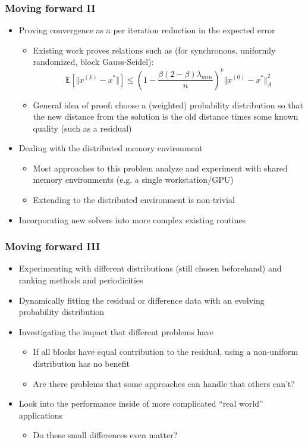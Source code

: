 \documentclass{beamer}
\begin{document}
\begin{frame}
	\frametitle{Moving forward II}
	\begin{itemize}
		\item Proving convergence as a per iteration reduction in the expected error
		\begin{itemize}
			\item Existing work proves relations such as (for synchronous, uniformly randomized, block Gauss-Seidel):
			\begin{equation}
			\mathbb{E}[\Vert x^{(k)} - x^* \Vert ] \leq \left( 1 - \frac{\beta (2 - \beta) \lambda_{min}}{n}\right)^k \Vert x^{(0)} - x^* \Vert^2_A
			\end{equation}
			\item General idea of proof: choose a (weighted) probability distribution so that the new distance from the solution is the old distance times some known quality (such as a residual)
		\end{itemize}
		\item Dealing with the distributed memory environment
			\begin{itemize}
				\item Most approaches to this problem analyze and experiment with shared memory environments (e.g. a single workstation/GPU)
				\item Extending to the distributed environment is non-trivial
			\end{itemize}
		\item Incorporating new solvers into more complex existing routines
	\end{itemize}
\end{frame}
 
\begin{frame}
	\frametitle{Moving forward III}
	\begin{itemize}
		\item Experimenting with different distributions (still chosen beforehand) and ranking methods and periodicities
		\item Dynamically fitting the residual or difference data with an evolving probability distribution
		\item Investigating the impact that different problems have
			\begin{itemize}
				\item If all blocks have equal contribution to the residual, using a non-uniform distribution has no benefit
				\item Are there problems that some approaches can handle that others can't?
			\end{itemize}
		\item Look into the performance inside of more complicated ``real world'' applications
			\begin{itemize}
				\item Do these small differences even matter?
			\end{itemize}
	\end{itemize}
\end{frame}
\end{document}
